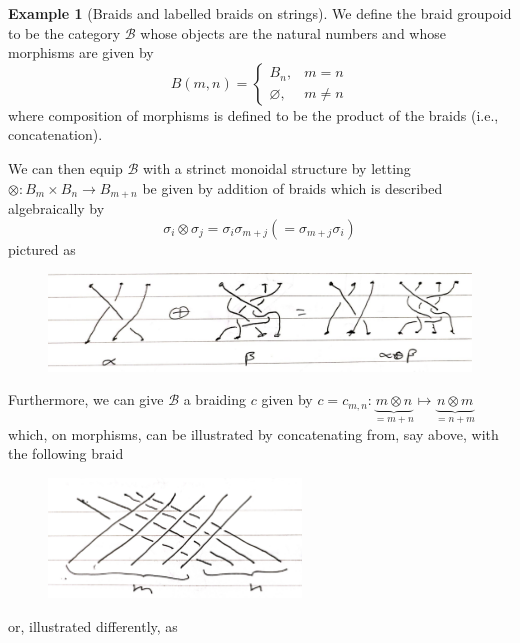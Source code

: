 \documentclass[reqno]{amsart}
\theoremstyle{definition}
\newtheorem{example}[theorem]{Example}
\theoremstyle{remark}
\begin{document}
   \begin{example}[Braids and labelled braids on strings]
       We define the braid groupoid to
       be the category $\mathcal{B}$ whose objects
       are the natural numbers and whose morphisms
       are given by
       \[
       B\left( m,n \right) =
       \begin{cases}
           B_n,& m=n\\
           \varnothing,& m\neq n
       \end{cases}
       \] 
       where composition of
       morphisms is defined to be
       the product of the braids (i.e., concatenation).

       We can then equip $\mathcal{B}$ with a strinct
       monoidal structure by letting
       $\otimes \colon B_m \times B_n \to 
       B_{m+n}$ be given by addition of braids
       which is described algebraically by
       \[
       \sigma_i \otimes
       \sigma_j = 
       \sigma_i \sigma_{m+j} \left( =
       \sigma_{m+j} \sigma_i \right) 
       \] 
       pictured as

       \begin{figure}[H]
           \centering
           \includegraphics[width=1\textwidth]{braids-monoidal-structure.jpeg}
           \label{fig:braids-monoidal-structure}
       \end{figure}
       Furthermore, we can give $\mathcal{B}$ a braiding
       $c$ given by
       $c = c_{m,n} \colon \underbrace{m \otimes n}_{
       = m +n} \mapsto \underbrace{n \otimes m}_{=n+m}$
       which, on morphisms,
       can be illustrated by concatenating from, say above, with the
       following braid 

       \begin{figure}[H]
           \centering
           \includegraphics[width=0.6\textwidth]{braiding-on-braid-groupoid.jpeg}
           \label{fig:braiding-on-braid-groupoid-jpeg}
       \end{figure}
       or, illustrated differently, as


\end{example}
\end{document}

